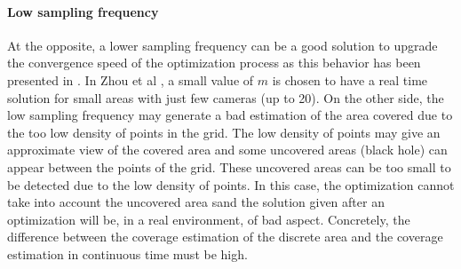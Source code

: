 
\paragraph*{Low sampling frequency}
At the opposite, a lower sampling frequency can be a good solution to upgrade the convergence speed of the optimization process as this behavior has been presented in \cite{8*zhou2011}. In Zhou et al \cite{8*zhou2011}, a small value of $m$ is chosen to have a real time solution for small areas with just few cameras (up to  20). 
On the other side, the low sampling frequency may generate a bad estimation of the area covered due to the too low density of points in the grid. The low density of points may give an approximate view of the covered area and some uncovered areas (black hole) can appear between the points of the grid. These uncovered areas can be too small to be detected due to the low density of points. In this case, the optimization cannot take into account the uncovered area sand the solution given after an optimization will be, in a real environment, of bad aspect. Concretely, the difference between the coverage estimation of the discrete area and the  coverage estimation in continuous time must be high.    \\





